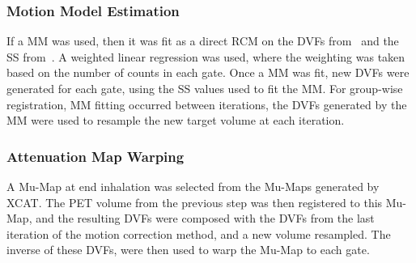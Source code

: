             \subsubsection{Motion Model Estimation} \label{sec:comparison_of_motion_correction_methods_incorporating_motion_modelling_for_pet_ct_using_a_single_breath_hold_attenuation_map_motion_model_estimation}
                If a \gls{MM} was used, then it was fit as a direct \gls{RCM} on the \glspl{DVF} from~ and the \gls{SS} from~. A weighted linear regression was used, where the weighting was taken based on the number of counts in each gate. Once a \gls{MM} was fit, new \glspl{DVF} were generated for each gate, using the \gls{SS} values used to fit the \gls{MM}. For group-wise registration, \gls{MM} fitting occurred between iterations, the \glspl{DVF} generated by the \gls{MM} were used to resample the new target volume at each iteration.
            
            \subsubsection{Attenuation Map Warping} \label{sec:comparison_of_motion_correction_methods_incorporating_motion_modelling_for_pet_ct_using_a_single_breath_hold_attenuation_map_attenuation_map_warping}
                A \gls{Mu-Map} at end inhalation was selected from the \glspl{Mu-Map} generated by \gls{XCAT}. The \gls{PET} volume from the previous step was then registered to this \gls{Mu-Map}, and the resulting \glspl{DVF} were composed with the \glspl{DVF} from the last iteration of the motion correction method, and a new volume resampled. The inverse of these \glspl{DVF}, were then used to warp the \gls{Mu-Map} to each gate.
            
